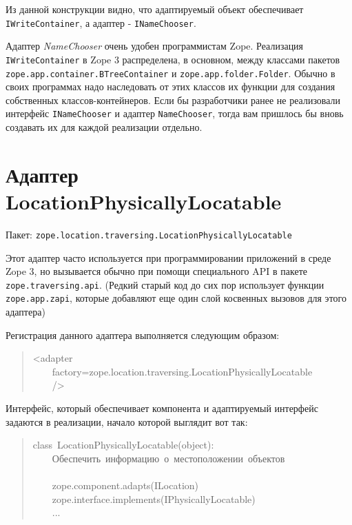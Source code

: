 \documentclass[a4paper,openany,twoside,final]{book}
\providecommand*{\DUroletitlereference}[1]{\textsl{#1}}
\begin{document}
Из данной конструкции видно, что адаптируемый объект обеспечивает
\texttt{IWriteContainer}, а адаптер - \texttt{INameChooser}.

Адаптер \DUroletitlereference{NameChooser} очень удобен программистам Zope.  Реализация
\texttt{IWriteContainer} в Zope 3 распределена, в основном, между классами
пакетов \texttt{zope.app.container.BTreeContainer} и
\texttt{zope.app.folder.Folder}.  Обычно в своих программах надо
наследовать от этих классов их функции для создания собственных
классов-контейнеров.  Если бы разработчики ранее не реализовали
интерфейс \texttt{INameChooser} и адаптер \texttt{NameChooser}, тогда вам
пришлось бы вновь создавать их для каждой реализации отдельно.


\section{Адаптер LocationPhysicallyLocatable%
  \label{locationphysicallylocatable}%
}

Пакет: \texttt{zope.location.traversing.LocationPhysicallyLocatable}

Этот адаптер часто используется при программировании приложений в
среде Zope 3, но вызывается обычно при помощи специального API в
пакете \texttt{zope.traversing.api}.  (Редкий старый код до сих пор
использует функции \texttt{zope.app.zapi}, которые добавляют еще один слой
косвенных вызовов для этого адаптера)

Регистрация данного адаптера выполняется следующим образом:

\begin{quote}{\ttfamily \raggedright \noindent
<adapter\\
~~~~factory=\textquotedbl{}zope.location.traversing.LocationPhysicallyLocatable\textquotedbl{}\\
~~~~/>
}
\end{quote}

Интерфейс, который обеспечивает компонента и адаптируемый интерфейс
задаются в реализации, начало которой выглядит вот так:

\begin{quote}{\ttfamily \raggedright \noindent
class~LocationPhysicallyLocatable(object):\\
~~~~\textquotedbl{}\textquotedbl{}\textquotedbl{}Обеспечить~информацию~о~местоположении~объектов\\
~~~~\textquotedbl{}\textquotedbl{}\textquotedbl{}\\
~~~~zope.component.adapts(ILocation)\\
~~~~zope.interface.implements(IPhysicallyLocatable)\\
~~~~...
}
\end{quote}
\end{document}
